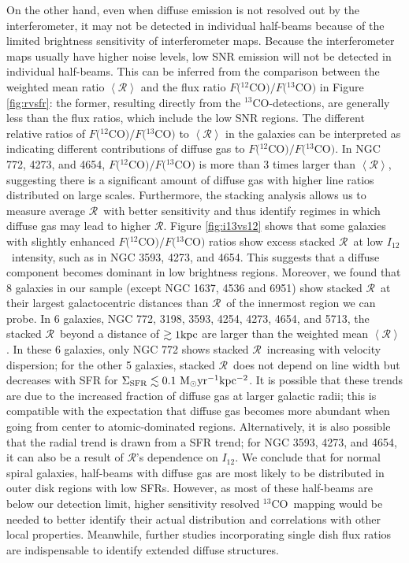 \documentclass{emulateapj}
\def\ttco{\mbox{$^{13}$CO}}
\def\twco{\mbox{$^{12}$CO}}
\def\rtt{$\mathcal{R}$}
\def\un{\rm \ }
\def\itw{$I_{12}$}
\begin{document}
On the other hand, even when diffuse emission is not resolved 
out by the interferometer, it may not be detected in individual half-beams
because of the limited brightness sensitivity of interferometer maps.
Because the interferometer maps usually have higher noise levels, 
low SNR emission will not be detected in individual half-beams. 
This can be inferred from the comparison between the 
weighted mean ratio $\left<\mathcal{R}\right>$ and the flux ratio  $F($\twco$)/F($\ttco$)$ 
in Figure \ref{fig:rvsfr}:
the former, resulting directly from the \ttco-detections, 
are generally less than the flux ratios, which include the low SNR regions.
The different relative ratios of $F($\twco$)/F($\ttco$)$ to  $\left<\mathcal{R}\right>$ 
in the galaxies can be interpreted as indicating different contributions 
of diffuse gas to $F($\twco$)/F($\ttco$)$. 
In NGC 772,  4273, and  4654, $F($\twco$)/F($\ttco$)$ is 
more than 3 times larger than $\left<\mathcal{R}\right>$, suggesting 
there is a significant amount of diffuse gas with higher line ratios distributed on large scales.
Furthermore, the stacking analysis allows us to measure 
average \rtt \ with better sensitivity and thus identify regimes in which diffuse gas may lead to higher \rtt.
Figure \ref{fig:i13vs12} shows
 that some galaxies with slightly enhanced $F($\twco$)/F($\ttco$)$ 
ratios show excess stacked \rtt \ at low \itw \ intensity, such as 
in NGC 3593, 4273, and 4654. 
This suggests that a diffuse component becomes dominant 
in low brightness regions. 
Moreover, we found that 8 galaxies in our sample (except NGC 1637, 4536 and 6951) show stacked \rtt \ at their largest galactocentric distances than \rtt \ of the innermost region we can probe. In 6 galaxies, NGC 772, 3198, 3593, 4254, 4273, 4654, and 5713, the stacked \rtt \ beyond a distance of $\gtrsim 1 \rm kpc$ are larger than the weighted mean $\left<\mathcal{R}\right>$.
In these 6 galaxies, only NGC 772 shows stacked \rtt \ increasing with velocity dispersion; 
for the other 5 galaxies, stacked \rtt \ does not depend on line width but decreases with SFR for $\Sigma_{\mathrm{SFR}}\lesssim 0.1 \un  M_{\odot} yr^{-1} kpc^{-2} $. 
It is possible that these trends are due to the increased fraction of diffuse gas at larger galactic radii; this is compatible with the expectation that diffuse gas becomes more abundant when going from center to atomic-dominated regions. 
Alternatively, it is also possible that the radial trend is drawn from a SFR trend; for NGC 3593, 4273, and 4654, it can also be a result of \rtt's dependence on \itw. 
We conclude that for normal spiral galaxies, half-beams with diffuse gas are most likely to be distributed in outer disk regions with low SFRs. 
However, as most of these half-beams are below our detection limit, 
higher sensitivity resolved \ttco \ mapping would be needed to 
better identify their actual distribution and correlations with other local properties.
Meanwhile,  
further studies incorporating single dish flux ratios 
are indispensable to identify extended diffuse structures.
\end{document}
